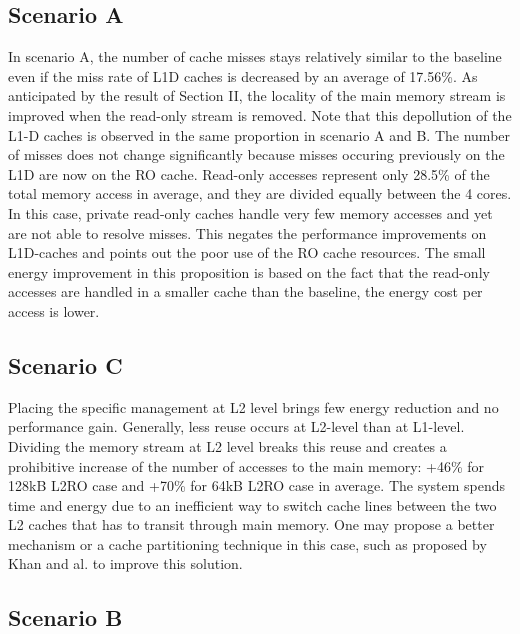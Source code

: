 \documentclass[sigconf]{acmart}
\begin{document}
\subsection{Scenario A}

In scenario A, the number of cache misses stays relatively similar to the baseline even if the miss rate of L1D caches is decreased by an average of 17.56\%. As anticipated by the result of Section II, the locality of the main memory stream is improved when the read-only stream is removed. Note that this depollution of the L1-D caches is observed in the same proportion in scenario A and B. The number of misses does not change significantly because misses occuring previously on the L1D are now on the RO cache. Read-only accesses represent only 28.5\% of the total memory access in average, and they are divided equally between the 4 cores. In this case, private read-only caches handle very few memory accesses and yet are not able to resolve misses. This negates the performance improvements on L1D-caches and points out the poor use of the RO cache resources. The small energy improvement in this proposition is based on the fact that the read-only accesses are handled in a smaller cache than the baseline, the energy cost per access is lower.

\subsection{Scenario C}

Placing the specific management at L2 level brings few energy reduction and no performance gain. Generally, less reuse occurs at L2-level than at L1-level. Dividing the memory stream at L2 level breaks this reuse and creates a prohibitive increase of the number of accesses to the main memory: +46\% for 128kB L2RO case and +70\% for 64kB L2RO case in average. The system spends time and energy due to an inefficient way to switch cache lines between the two L2 caches that has to transit through main memory. One may propose a better mechanism or a cache partitioning technique in this case, such as proposed by Khan and al.\cite{Khan:2014} to improve this solution. 

\subsection{Scenario B}
\end{document}
